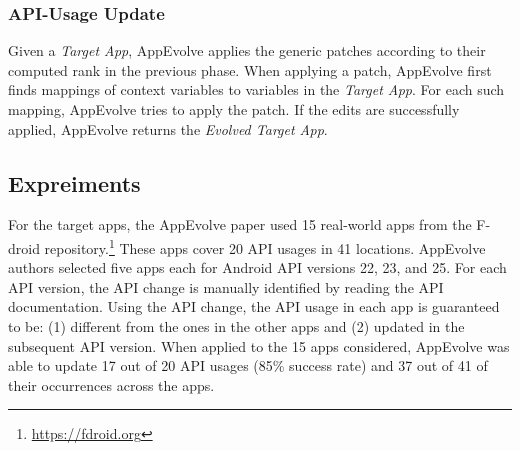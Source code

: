 \subsubsection{API-Usage Update}
Given a {\em Target App}, AppEvolve applies the generic patches according to their computed rank in the previous phase. When applying a patch, AppEvolve first finds mappings of context variables to variables in the {\em Target App}. For each such mapping, AppEvolve tries to apply the patch. If the edits are successfully applied, AppEvolve returns the {\em Evolved Target App}.

\subsection{Expreiments}
For the target apps, the AppEvolve paper used 15 real-world apps from the F-droid repository.\footnote{\url{https://fdroid.org}} These  apps cover 20 API usages in 41 locations. AppEvolve authors selected five apps each for Android API versions 22, 23, and 25. For each API version, the API change is manually identified by reading the API
documentation. Using the API change, the API usage in each app is guaranteed to be: (1) different from the ones in the other apps and (2)
updated in the subsequent API version. 
When applied to the 15 apps considered, AppEvolve was able to update 17 out of 20 API usages (85\% success rate) and 37 out of 41 of their occurrences across the apps.


